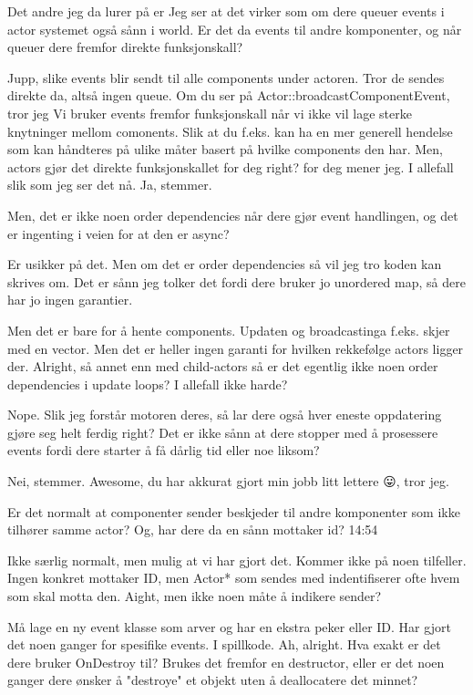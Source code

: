Det andre jeg da lurer på er
Jeg ser at det virker som om dere queuer events i actor systemet også sånn i world.
Er det da events til andre komponenter, og når queuer dere fremfor direkte funksjonskall?

Jupp, slike events blir sendt til alle components under actoren.
Tror de sendes direkte da, altså ingen queue. Om du ser på Actor::broadcastComponentEvent, tror jeg
Vi bruker events fremfor funksjonskall når vi ikke vil lage sterke knytninger mellom comonents. Slik at du f.eks. kan ha en mer generell hendelse som kan håndteres på ulike måter basert på hvilke components den har.
Men, actors gjør det direkte funksjonskallet for deg right?
for deg mener jeg. I allefall slik som jeg ser det nå.
Ja, stemmer.

Men, det er ikke noen order dependencies når dere gjør event handlingen, og det er ingenting i veien for at den er async?

Er usikker på det. Men om det er order dependencies så vil jeg tro koden kan skrives om.
Det er sånn jeg tolker det fordi dere bruker jo unordered map, så dere har jo ingen garantier.

Men det er bare for å hente components. Updaten og broadcastinga f.eks. skjer med en vector. Men det er heller ingen garanti for hvilken rekkefølge actors ligger der.
Alright, så annet enn med child-actors så er det egentlig ikke noen order dependencies i update loops? I allefall ikke harde?

Nope.
Slik jeg forstår motoren deres, så lar dere også hver eneste oppdatering gjøre seg helt ferdig right? Det er ikke sånn at dere stopper med å prosessere events fordi dere starter å få dårlig tid eller noe liksom?

Nei, stemmer.
Awesome, du har akkurat gjort min jobb litt lettere 😛, tror jeg.

Er det normalt at componenter sender beskjeder til andre komponenter som ikke tilhører samme actor?
Og, har dere da en sånn mottaker id?
14:54

Ikke særlig normalt, men mulig at vi har gjort det. Kommer ikke på noen tilfeller.
Ingen konkret mottaker ID, men Actor* som sendes med indentifiserer ofte hvem som skal motta den.
Aight, men ikke noen måte å indikere sender?

Må lage en ny event klasse som arver og har en ekstra peker eller ID. Har gjort det noen ganger for spesifike events.
I spillkode.
Ah, alright.
Hva exakt er det dere bruker OnDestroy til? Brukes det fremfor en destructor, eller er det noen ganger dere ønsker å "destroye" et objekt uten å deallocatere det minnet?

